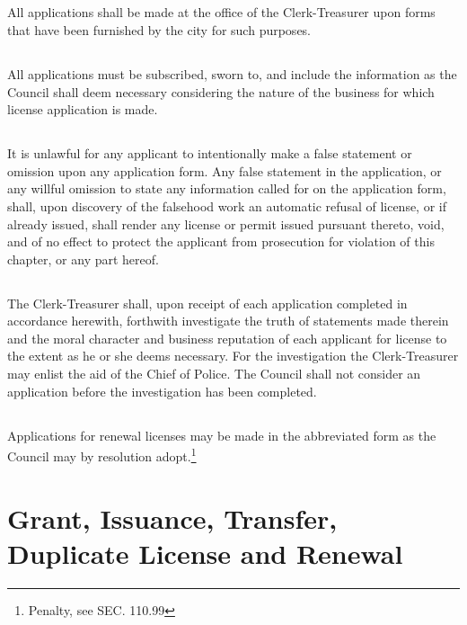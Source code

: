\subsection{}
All applications shall be made at the office of the Clerk-Treasurer upon forms that have been furnished by the city for such purposes.
\subsection{}
All applications must be subscribed, sworn to, and include the information as the Council shall deem necessary considering the nature of the business for which license application is made.
\subsection{}
It is unlawful for any applicant to intentionally make a false statement or omission upon any application form.  Any false statement in the application, or any willful omission to state any information called for on the application form, shall, upon discovery of the falsehood work an automatic refusal of license, or if already issued, shall render any license or permit issued pursuant thereto, void, and of no effect to protect the applicant from prosecution for violation of this chapter, or any part hereof.
\subsection{}
The Clerk-Treasurer shall, upon receipt of each application completed in accordance herewith, forthwith investigate the truth of statements made therein and the moral character and business reputation of each applicant for license to the extent as he or she deems necessary.  For the investigation the Clerk-Treasurer may enlist the aid of the Chief of Police.  The Council shall not consider an application before the investigation has been completed.
\subsection{}
Applications for renewal licenses may be made in the abbreviated form as the Council may by resolution adopt.\footnote{Penalty, see SEC. 110.99}

\section{Grant, Issuance, Transfer, Duplicate License and Renewal}
